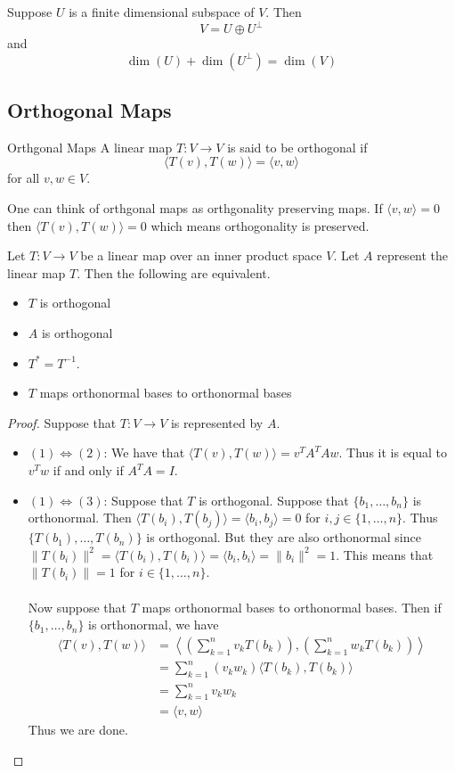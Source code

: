 \documentclass[a4paper]{article}
\begin{document}
\begin{thm}{}{} Suppose $U$ is a finite dimensional subspace of $V$. Then $$V=U\oplus U^\perp$$ and $$\dim(U)+\dim(U^\perp)=\dim(V)$$
\end{thm}

\subsection{Orthogonal Maps}
\begin{defn}{Orthgonal Maps}{} A linear map $T:V\to V$ is said to be orthogonal if $$\langle T(v), T(w)\rangle=\langle v, w\rangle$$ for all $v,w\in V$. 
\end{defn}

One can think of orthgonal maps as orthgonality preserving maps. If $\langle v,w\rangle=0$ then $\langle T(v),T(w)\rangle=0$ which means orthogonality is preserved.

\begin{prp}{}{} Let $T:V\to V$ be a linear map over an inner product space $V$. Let $A$ represent the linear map $T$. Then the following are equivalent. 
\begin{itemize}
\item $T$ is orthogonal
\item $A$ is orthogonal
\item $T^\ast=T^{-1}$. 
\item $T$ maps orthonormal bases to orthonormal bases
\end{itemize} \tcbline
\begin{proof} Suppose that $T:V\to V$ is represented by $A$. 
\begin{itemize}
\item $(1)\iff(2)$: We have that $\langle T(v),T(w)\rangle=v^TA^TAw$. Thus it is equal to $v^Tw$ if and only if $A^TA=I$. 
\item $(1)\iff(3)$: Suppose that $T$ is orthogonal. Suppose that $\{b_1,\dots,b_n\}$ is orthonormal. Then $\langle T(b_i),T(b_j)\rangle=\langle b_i,b_j\rangle=0$ for $i,j\in\{1,\dots,n\}$. Thus $\{T(b_1),\dots,T(b_n)\}$ is orthogonal. But they are also orthonormal since $\|T(b_i)\|^2=\langle T(b_i),T(b_i)\rangle=\langle b_i,b_i\rangle=\|b_i\|^2=1$. This means that $\|T(b_i)\|=1$ for $i\in\{1,\dots,n\}$. \\~\\
Now suppose that $T$ maps orthonormal bases to orthonormal bases. Then if $\{b_1,\dots,b_n\}$ is orthonormal, we have 
\begin{align*}
\langle T(v),T(w)\rangle&=\left\langle\left(\sum_{k=1}^nv_kT(b_k)\right),\left(\sum_{k=1}^nw_kT(b_k)\right)\right\rangle\\
&=\sum_{k=1}^n(v_kw_k)\langle T(b_k),T(b_k)\rangle\tag{$\langle T(b_i),T(b_j)\rangle=0$ if $i\neq j$}\\
&=\sum_{k=1}^nv_kw_k\\
&=\langle v,w\rangle
\end{align*}
Thus we are done. 
\end{itemize}
\end{proof}
\end{prp}
\end{document}
